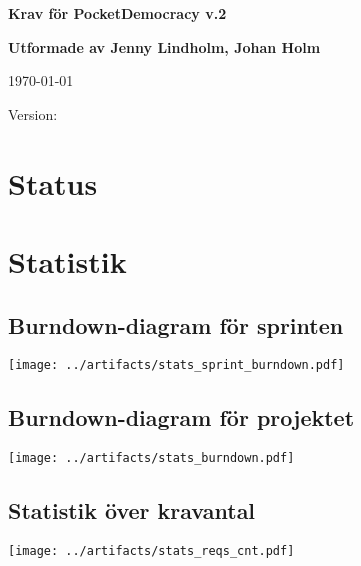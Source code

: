 \documentclass{report}
\begin{document}
\thispagestyle{empty}

\mbox{}

\vfill

{\LARGE\textbf{Krav för PocketDemocracy v.2}}

\vfill

{\Large\textbf{Utformade av Jenny Lindholm, Johan Holm}}

\vfill

\today

\vfill

Version: 

\vfill

\newpage

\tableofcontents

\newpage

\chapter{Status}




\chapter{Statistik}
\section{Burndown-diagram för sprinten}
\texttt{[image: ../artifacts/stats\_sprint\_burndown.pdf]}

\section{Burndown-diagram för projektet}
\texttt{[image: ../artifacts/stats\_burndown.pdf]}

\section{Statistik över kravantal}
\texttt{[image: ../artifacts/stats\_reqs\_cnt.pdf]}
\end{document}
